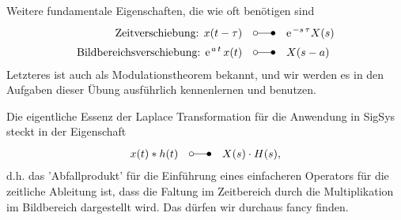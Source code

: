 \documentclass[11pt,a4paper,DIV=12]{scrartcl}
\numberwithin{equation}{section}
\numberwithin{figure}{section}
\begin{document}
Weitere fundamentale Eigenschaften, die wie oft benötigen sind
\begin{align}
\text{Zeitverschiebung:   } x(t-\tau)& \quad\laplace\quad \e^{-s\,\tau} X(s)\\
\text{Bildbereichsverschiebung:   } \e^{a\,t} \, x(t)& \quad\laplace\quad X(s-a)
\end{align}
Letzteres ist auch als Modulationstheorem bekannt, und wir werden es in den
Aufgaben dieser Übung ausführlich kennenlernen und benutzen.

Die eigentliche Essenz der Laplace Transformation für die Anwendung in
SigSys steckt in der Eigenschaft
\begin{align}
\label{eq:laplace_intro_ast_mult}
x(t) \ast h(t) \quad\laplace\quad X(s) \cdot H(s),
\end{align}
d.h. das 'Abfallprodukt' für die Einführung eines einfacheren Operators
für die zeitliche Ableitung ist, dass die Faltung im Zeitbereich durch die
Multiplikation im Bildbereich dargestellt wird. Das dürfen wir durchaus fancy finden.
\end{document}
